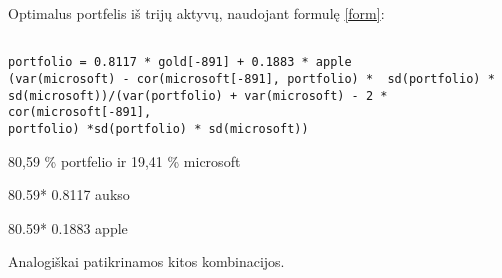 \documentclass[12pt, a14paper, lithuanian]{article}
\begin{document}
\begin{comment}

 Apytikslės koeficientų reikšmės portfelyje iš dviejų įmonių:



\begin{figure}[H]
  \centering
  \begin{verbatim}
\texttt{[image: kursinis-026]}
\end{verbatim}
  \caption{...}
  
\end{figure}

(gal nereikia)
Iliustracija: pagal grafikus rinktis ta skaiciu, ties kuriuo standartinis nuokrypis maziausias, ji istatyti vietoje i.

\textit{optimaliausias portfelis} = $imone1 \times i \times 0.1 + imone2 \times (1 - i\times 0.1)$ \\


$0.1 \times (i-1) \times Auksas + (1-0.1 \times (i-1)) \times Microsoft$

$0.1 \times (i-1) \times Apple + (1-0.1 \times (i-1)) \times Microsoft$

$0.1 \times (i-1) \times Apple + (1-0.1\times (i-1)) \times Auksas$

\end{comment}

Optimalus portfelis iš trijų aktyvų, naudojant formulę \eqref{form}:
\begin{verbatim}

portfolio = 0.8117 * gold[-891] + 0.1883 * apple
(var(microsoft) - cor(microsoft[-891], portfolio) *  sd(portfolio) *
sd(microsoft))/(var(portfolio) + var(microsoft) - 2 * cor(microsoft[-891],
portfolio) *sd(portfolio) * sd(microsoft))
\end{verbatim}

80,59 \% portfelio ir 19,41 \% microsoft

80.59* 0.8117 aukso

80.59* 0.1883 apple


Analogiškai patikrinamos kitos kombinacijos.
\end{document}
